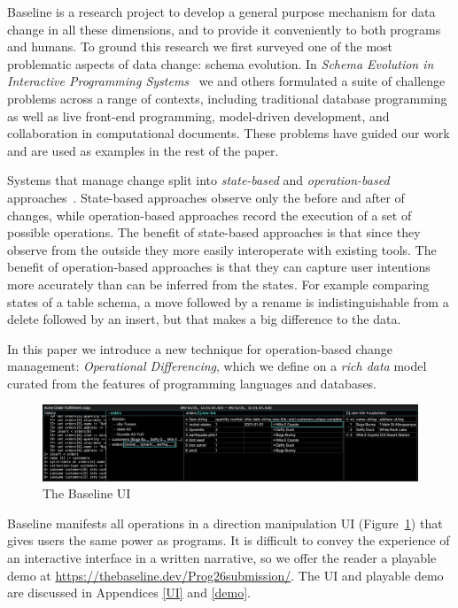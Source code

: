 \documentclass[english,submission]{programming}
\theoremstyle{definition}
\begin{document}
Baseline is a research project to develop a general purpose mechanism for data change in all these dimensions, and to provide it conveniently to both programs and humans.
To ground this research we first surveyed one of the most problematic aspects of data change: schema evolution. In \textit{Schema Evolution in Interactive Programming Systems}~\cite{challenge-problems} we and others formulated a suite of challenge problems across a range of contexts, including traditional database programming as well as live front-end programming, model-driven development, and collaboration in computational documents. These problems have guided our work and are used as examples in the rest of the paper.

Systems that manage change split into \textit{state-based} and \textit{operation-based} approaches~\cite{diff3, Shapiro11}. State-based approaches observe only the before and after of changes, while operation-based approaches record the execution of a set of possible operations.
The benefit of state-based approaches is that since they observe from the outside they more easily interoperate with existing tools.
The benefit of operation-based approaches is that they can capture user intentions more accurately than can be inferred from the states. For example comparing states of a table schema, a move followed by a rename is indistinguishable from a delete followed by an insert, but that makes a big difference to the data.

In this paper we introduce a new technique for operation-based change management: \textit{Operational Differencing}, which we define on a \textit{rich data} model curated from the features of programming languages and databases.

\begin{figure}
\includegraphics[width=\textwidth]{GUI.png}
\caption{The Baseline UI}
\label{fig:UI-plain}
\end{figure}

Baseline manifests all operations in a direction manipulation UI (Figure~\ref{fig:UI-plain}) that gives users the same power as programs. It is difficult to convey the experience of an interactive interface in a written narrative, so we offer the reader a playable demo at \url{https://thebaseline.dev/Prog26submission/}. The UI and playable demo are discussed in Appendices \ref{UI} and \ref{demo}.
\end{document}
